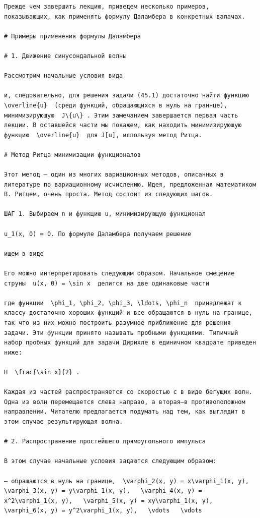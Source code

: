 \documentclass[
  ukrainian,
]{article}
\begin{document}
\begin{verbatim}
Прежде чем завершить лекцию, приведем несколько примеров, показывающих, как применять формулу Даламбера в конкретных валачах.

# Примеры применения формулы Даламбера

# 1. Движение синусондальной волны

Рассмотрим начальные условия вида

и, следовательно, для решения задачи (45.1) достаточно найти функцию  \overline{u}  (среди функций, обращающихся в нуль на граннце), минимизирующую  J\{u\} . Этим замечанием завершается первая часть лекции. В оставшейся части мы покажем, как находить минимизирующую функцию  \overline{u}  для J[u], используя метод Ритца.

# Метод Ритца минимизации функционалов

Этот метод — один из многих вариационных методов, описанных в литературе по вариационному исчислению. Идея, предложенная математиком В. Ритцем, очень проста. Метод состоит из следующих шагов.

ШАГ 1. Выбираем n и функцию u, минимизирующую функционал

u_1(x, 0) = 0. По формуле Даламбера получаем решение

ищем в виде

Его можно интерпретировать следующим образом. Начальное смещение струны  u(x, 0) = \sin x  делится на две одинаковые части

где функции  \phi_1, \phi_2, \phi_3, \ldots, \phi_n  принадлежат к классу достаточно хороших функций и все обращаются в нуль на границе, так что из них можно построить разумное приближение для решения задачи. Эти функции принято называть пробными функциями. Типичный набор пробных функций для задачи Дирихле в единичном квадрате приведен ниже:

H  \frac{\sin x}{2} .

Каждая из частей распространяется со скоростью с в виде бегущих волн. Одна из волн перемещается слева направо, а вторая—в противоположном направлении. Читателю предлагается подумать над тем, как выглядит в этом случае результирующая волна.

# 2. Распространение простейшего прямоугольного импульса

В этом случае начальные условия задаются следующим образом:

— обращаются в нуль на границе,  \varphi_2(x, y) = x\varphi_1(x, y),   \varphi_3(x, y) = y\varphi_1(x, y),   \varphi_4(x, y) = x^2\varphi_1(x, y),   \varphi_5(x, y) = xy\varphi_1(x, y),   \varphi_6(x, y) = y^2\varphi_1(x, y),   \vdots   \vdots


\end{verbatim}
\end{document}

